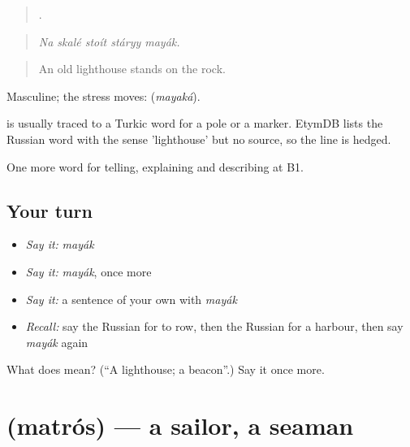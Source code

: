 \begin{quote}
    .
\end{quote}

\begin{quote}
\emph{Na skalé stoít stáryy mayák.}
\end{quote}

\begin{quote}
An old lighthouse stands on the rock.
\end{quote}

Masculine; the stress moves: \emph{} (\emph{mayaká}).

\begin{cousinweb}
\emph{} is usually traced to a Turkic word for a pole or a marker. EtymDB lists the Russian word with the sense 'lighthouse' but no source, so the line is hedged.
\end{cousinweb}

\begin{grammarlens}[title={What you've built}]
One more word for telling, explaining and describing at B1.
\end{grammarlens}

\subsection*{Your turn}
\begin{itemize}
\raggedright
  \item \emph{Say it:} \emph{mayák}
  \item \emph{Say it:} \emph{mayák}, once more
  \item \emph{Say it:} a sentence of your own with \emph{mayák}
  \item \emph{Recall:} say the Russian for to row, then the Russian for a harbour, then say \emph{mayák} again
\end{itemize}

\begin{tcolorbox}[breakable,colback=teal!4,colframe=teal!35!black,title={Before you move on}]
What does  mean? (\textquotedblleft{}A lighthouse; a beacon\textquotedblright{}.) Say it once more.
\end{tcolorbox}
\section[\texorpdfstring{\ru{матрос} (matrós)}{матрос (matrós)}]{ (matrós) — a sailor, a seaman}

